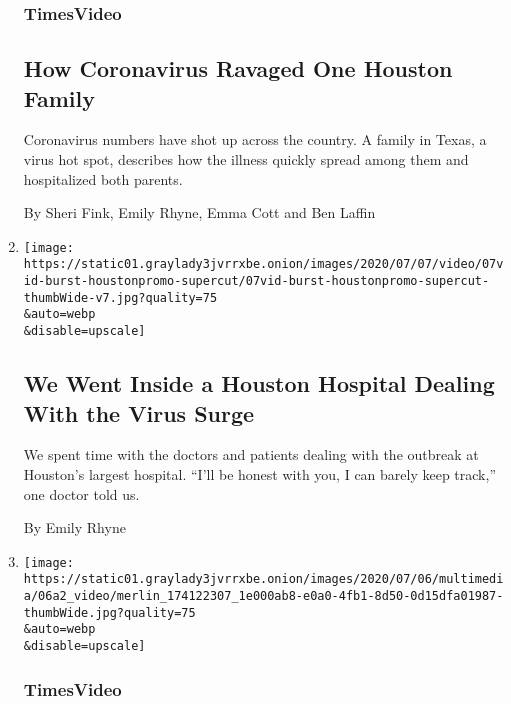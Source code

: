 \begin{enumerate}
  \hypertarget{timesvideo}{%
  \subsubsection{TimesVideo}\label{timesvideo}}

  \hypertarget{how-coronavirus-ravaged-one-houston-family}{%
  \subsection{How Coronavirus Ravaged One Houston
  Family}\label{how-coronavirus-ravaged-one-houston-family}}

  Coronavirus numbers have shot up across the country. A family in
  Texas, a virus hot spot, describes how the illness quickly spread
  among them and hospitalized both parents.

  By Sheri Fink, Emily Rhyne, Emma Cott and Ben Laffin
\item
  \href{/interactive/2020/07/07/burst/houston-coronavirus-hospital.html}{}

  \texttt{[image: https://static01.graylady3jvrrxbe.onion/images/2020/07/07/video/07vid-burst-houstonpromo-supercut/07vid-burst-houstonpromo-supercut-thumbWide-v7.jpg?quality=75\\\&auto=webp\\\&disable=upscale]}

  \hypertarget{we-went-inside-a-houston-hospital-dealing-with-the-virus-surge}{%
  \subsection{We Went Inside a Houston Hospital Dealing With the Virus
  Surge}\label{we-went-inside-a-houston-hospital-dealing-with-the-virus-surge}}

  We spent time with the doctors and patients dealing with the outbreak
  at Houston's largest hospital. ``I'll be honest with you, I can barely
  keep track,'' one doctor told us.

  By Emily Rhyne
\item
  \href{/video/us/100000007218908/coronavirus-cases-texas.html}{}

  \texttt{[image: https://static01.graylady3jvrrxbe.onion/images/2020/07/06/multimedia/06a2\_video/merlin\_174122307\_1e000ab8-e0a0-4fb1-8d50-0d15dfa01987-thumbWide.jpg?quality=75\\\&auto=webp\\\&disable=upscale]}

  \hypertarget{timesvideo-1}{%
  \subsubsection{TimesVideo}\label{timesvideo-1}}


\end{enumerate}
